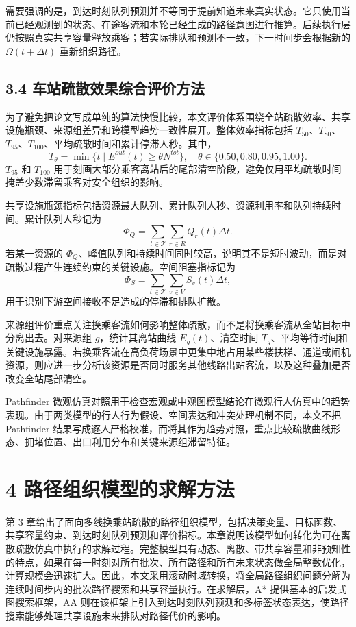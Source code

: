 \documentclass[UTF8,a4paper,12pt]{ctexart}
\begin{document}
需要强调的是，到达时刻队列预测并不等同于提前知道未来真实状态。它只使用当前已经观测到的状态、在途客流和本轮已经生成的路径意图进行推算。后续执行层仍按照真实共享容量释放乘客；若实际排队和预测不一致，下一时间步会根据新的 \(\Omega(t+\Delta t)\) 重新组织路径。

\subsection{3.4 车站疏散效果综合评价方法}

为了避免把论文写成单纯的算法快慢比较，本文评价体系围绕全站疏散效率、共享设施瓶颈、来源组差异和跨模型趋势一致性展开。整体效率指标包括 \(T_{50}\)、\(T_{80}\)、\(T_{95}\)、\(T_{100}\)、平均疏散时间和累计停滞人秒。其中，
\[
T_{\theta}=\min\{t\mid E^{out}(t)\geq \theta N^{tot}\},\quad \theta\in\{0.50,0.80,0.95,1.00\}.
\]
\(T_{95}\) 和 \(T_{100}\) 用于刻画大部分乘客离站后的尾部清空阶段，避免仅用平均疏散时间掩盖少数滞留乘客对安全组织的影响。

共享设施瓶颈指标包括资源最大队列、累计队列人秒、资源利用率和队列持续时间。累计队列人秒记为
\[
\Phi_Q=\sum_{t\in\mathcal T}\sum_{r\in R}Q_r(t)\Delta t.
\]
若某一资源的 \(\Phi_Q\)、峰值队列和持续时间同时较高，说明其不是短时波动，而是对疏散过程产生连续约束的关键设施。空间阻塞指标记为
\[
\Phi_S=\sum_{t\in\mathcal T}\sum_{v\in V}S_v(t)\Delta t,
\]
用于识别下游空间接收不足造成的停滞和排队扩散。

来源组评价重点关注换乘客流如何影响整体疏散，而不是将换乘客流从全站目标中分离出去。对来源组 \(g\)，统计其离站曲线 \(E_g(t)\)、清空时间 \(T_g\)、平均等待时间和关键设施暴露。若换乘客流在高负荷场景中更集中地占用某些楼扶梯、通道或闸机资源，则应进一步分析该资源是否同时服务其他线路出站客流，以及这种叠加是否改变全站尾部清空。

Pathfinder 微观仿真对照用于检查宏观或中观图模型结论在微观行人仿真中的趋势表现。由于两类模型的行人行为假设、空间表达和冲突处理机制不同，本文不把 Pathfinder 结果写成逐人严格校准，而将其作为趋势对照，重点比较疏散曲线形态、拥堵位置、出口利用分布和关键来源组滞留特征。

\section{4 路径组织模型的求解方法}

第 3 章给出了面向多线换乘站疏散的路径组织模型，包括决策变量、目标函数、共享容量约束、到达时刻队列预测和评价指标。本章说明该模型如何转化为可在离散疏散仿真中执行的求解过程。完整模型具有动态、离散、带共享容量和非预知性的特点，如果在每一时刻对所有批次、所有路径和所有未来状态做全局整数优化，计算规模会迅速扩大。因此，本文采用滚动时域转换，将全局路径组织问题分解为连续时间步内的批次路径搜索和共享容量执行。在求解层，A* 提供基本的启发式图搜索框架，AA 则在该框架上引入到达时刻队列预测和多标签状态表达，使路径搜索能够处理共享设施未来排队对路径代价的影响。
\end{document}
